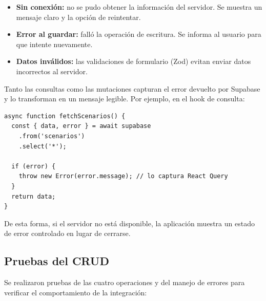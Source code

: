 \begin{itemize}
  \item \textbf{Sin conexi\'on:} no se pudo obtener la informaci\'on del
    servidor. Se muestra un mensaje claro y la opci\'on de reintentar.
  \item \textbf{Error al guardar:} fall\'o la operaci\'on de escritura.
    Se informa al usuario para que intente nuevamente.
  \item \textbf{Datos inv\'alidos:} las validaciones de formulario (Zod)
    evitan enviar datos incorrectos al servidor.
\end{itemize}

Tanto las consultas como las mutaciones capturan el error devuelto por
Supabase y lo transforman en un mensaje legible. Por ejemplo, en el hook
de consulta:

\begin{lstlisting}
async function fetchScenarios() {
  const { data, error } = await supabase
    .from('scenarios')
    .select('*');

  if (error) {
    throw new Error(error.message); // lo captura React Query
  }
  return data;
}
\end{lstlisting}

De esta forma, si el servidor no est\'a disponible, la aplicaci\'on
muestra un estado de error controlado en lugar de cerrarse.

\subsection{Pruebas del CRUD}

Se realizaron pruebas de las cuatro operaciones y del manejo de errores
para verificar el comportamiento de la integraci\'on:

